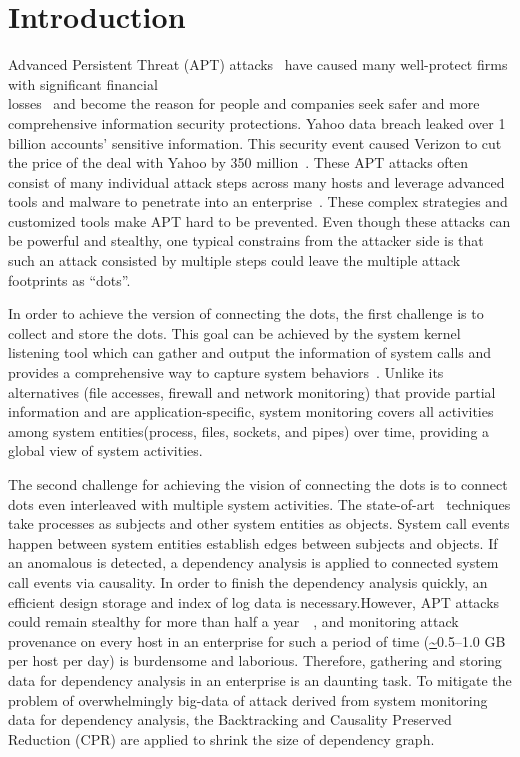 \section{Introduction}
Advanced Persistent Threat (APT) attacks~\cite{fireeye:anatomy,aptsymantec} have caused many well-protect firms with significant financial\\ losses~\cite{ebay,opm,target,homedepot} and become the reason for people and companies seek safer and more comprehensive information security protections. Yahoo data breach leaked over 1 billion accounts' sensitive information. This security event caused Verizon to cut the price of the deal with Yahoo by 350 million~\cite{ya:yahooleak,aptsymantec}. These APT attacks often consist of many individual attack steps across many hosts and leverage advanced tools and malware to penetrate into an enterprise~\cite{fireeye:anatomy,aptsymantec}. These complex strategies and customized tools make APT hard to be prevented. Even though these attacks can be powerful and stealthy, one typical constrains from the attacker side is that such an attack consisted by multiple steps could leave the multiple attack footprints as ``dots''.

In order to achieve the version of connecting the dots, the first challenge is to collect and store the dots. This goal can be achieved by the system kernel listening tool which can gather and output the information of system calls and provides a comprehensive way to capture system behaviors~\cite{backtracking,backtracking2}. Unlike its alternatives (file accesses, firewall and network monitoring) that provide partial  information and are application-specific, system monitoring covers all activities among system entities(process, files, sockets, and pipes) over time, providing a global view of system activities.

The second challenge for achieving the vision of connecting the dots is to connect dots even interleaved with multiple system activities. The state-of-art~\cite{taser,backtracking,backtracking2} techniques take processes as subjects and other system entities as objects. System call events happen between system entities establish edges between subjects and objects. If an anomalous is detected, a dependency analysis is applied to  connected system call events via causality. In order to finish the dependency analysis quickly, an efficient design storage and index of log data is necessary.However, APT attacks could remain stealthy for more than half a year~~\cite{trustwave}, and monitoring attack provenance on every host in an enterprise for such a period of time (\url{~}0.5--1.0 GB per host per day) is burdensome and laborious. Therefore, gathering and storing data for dependency analysis in an enterprise is an daunting task. To mitigate the problem of overwhelmingly big-data of attack derived from system monitoring data for dependency analysis, the Backtracking and Causality Preserved Reduction (CPR) are applied to shrink the size of dependency graph.

